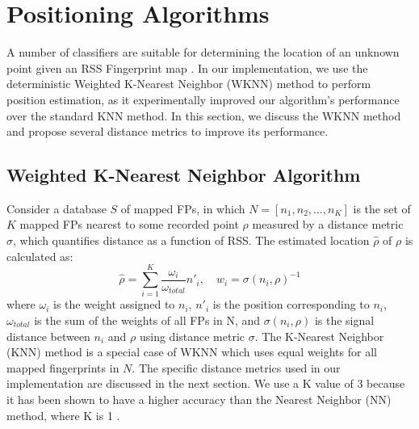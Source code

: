 \documentclass[conference]{IEEEtran}
\begin{document}
\begin{table}[!t]
\renewcommand{\arraystretch}{1.3}
\caption{MAC Coverage by Scan Numbers}
\label{tab:MAC_accuracy}
\centering
{}
\end{table}

\section{Positioning Algorithms}
A number of classifiers are suitable for determining the location of an unknown point given an RSS Fingerprint map \cite{Sayad2}\cite{Chaudhuri}. In our implementation, we use the deterministic Weighted K-Nearest Neighbor (WKNN) method to perform position estimation, as it experimentally improved our algorithm's performance over the standard KNN method. In this section, we discuss the WKNN method and propose several distance metrics to improve its performance. 
\subsection{Weighted K-Nearest Neighbor Algorithm}
\indent Consider a database $S$ of mapped FPs, in which $N=[n_1, n_2, ..., n_K]$ is the set of $K$ mapped FPs nearest to some recorded point $\rho$ measured by a distance metric $\sigma$, which quantifies distance as a function of RSS. The estimated location $\hat{\rho}$ of $\rho$ is calculated as:
\begin{equation}
\label{eq:wknn}
\hat{\rho} = \sum\limits_{i=1}^{K}\frac{\omega_i}{\omega_{total}}n'_i, \quad w_i = \sigma(n_i, \rho)^{-1}
\end{equation}
where $\omega_i$ is the weight assigned to $n_i$, $n'_i$ is the position corresponding to $n_i$, $\omega_{total}$ is the sum of the weights of all FPs in N, and $\sigma(n_i, \rho)$ is the signal distance between $n_i$ and $\rho$ using distance metric $\sigma$. The K-Nearest Neighbor (KNN) method is a special case of WKNN which uses equal weights for all mapped fingerprints in $N$. The specific distance metrics used in our implementation are discussed in the next section. We use a K value of 3 because it has been shown to have a higher accuracy than the Nearest Neighbor (NN) method, where K is 1 \cite{Kokkinis}. 
\end{document}
